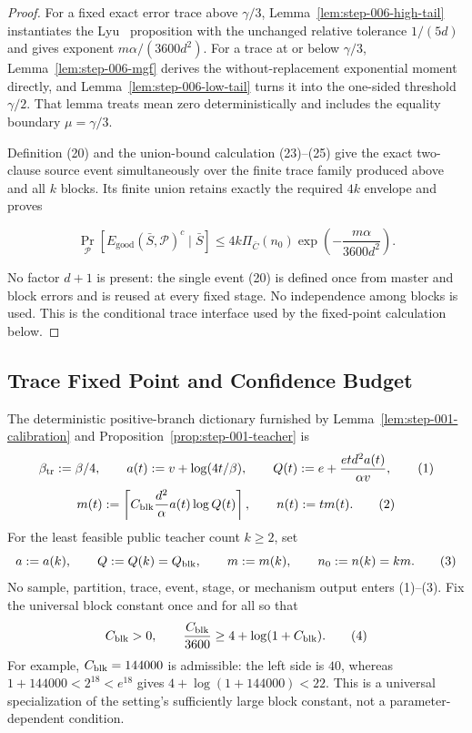 \begin{proof}
For a fixed exact error trace above \(\gamma/3\),
Lemma~\ref{lem:step-006-high-tail} instantiates the Lyu~\citep{lyu2025} proposition
with the unchanged relative tolerance \(1/(5d)\) and gives exponent
\(m\alpha/(3600d^2)\).  For a trace at or below \(\gamma/3\),
Lemma~\ref{lem:step-006-mgf} derives the without-replacement exponential
moment directly, and Lemma~\ref{lem:step-006-low-tail} turns it into the
one-sided threshold \(\gamma/2\).  That lemma treats mean zero
deterministically and includes the equality boundary \(\mu=\gamma/3\).

Definition (20) and the union-bound calculation (23)--(25) give the exact two-clause
source event simultaneously over the finite trace family produced above and
all \(k\) blocks.  Its finite union retains exactly
the required \(4k\) envelope and proves

\[
 \Pr_{\mathcal P}
 [E_{\mathrm{good}}(\bar S,\mathcal P)^c\mid\bar S]
 \leq4k\Pi_{\bar C}(n_0)
 \exp\!\left(-\frac{m\alpha}{3600d^2}\right).
\tag{26}
\]

No factor \(d+1\) is present: the single event (20) is defined once from
master and block errors and is reused at every fixed stage. No
independence among blocks is used.  This is the conditional trace interface
used by the fixed-point calculation below.



\end{proof}

\subsection{Trace Fixed Point and Confidence Budget}\label{app:step_007}


The deterministic positive-branch dictionary furnished by
Lemma~\ref{lem:step-001-calibration} and
Proposition~\ref{prop:step-001-teacher} is
\[
 \beta_{\rm tr}:=\beta/4,
 \qquad
 a(t):=v+\log(4t/\beta),
 \qquad
 Q(t):=e+\frac{etd^2a(t)}{\alpha v},
\tag{1}
\]
\[
 m(t):=\left\lceil
 C_{\rm blk}\frac{d^2}{\alpha}a(t)\log Q(t)
 \right\rceil,
 \qquad n(t):=tm(t).
\tag{2}
\]
For the least feasible public teacher count \(k\ge2\), set
\[
 a:=a(k),\qquad Q:=Q(k)=Q_{\rm blk},\qquad
 m:=m(k),\qquad n_0:=n(k)=km.
\tag{3}
\]
No sample, partition, trace, event, stage, or mechanism output enters
(1)--(3).  Fix the universal block constant once and for all so that
\[
 C_{\rm blk}>0,
 \qquad
 \frac{C_{\rm blk}}{3600}
 \ge 4+\log(1+C_{\rm blk}).
\tag{4}
\]
For example, \(C_{\rm blk}=144000\) is admissible: the left side is
\(40\), whereas
\(1+144000<2^{18}<e^{18}\) gives
\(4+\log(1+144000)<22\).  This is a universal specialization of the
setting's sufficiently large block constant, not a parameter-dependent
condition.

